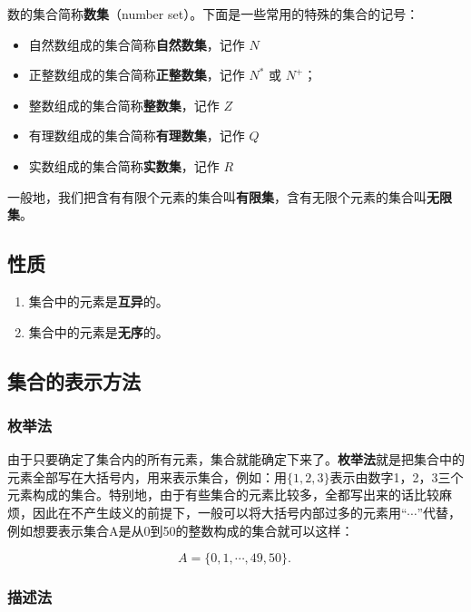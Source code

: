 数的集合简称\textbf{数集}（number set）。下面是一些常用的特殊的集合的记号：
\begin{itemize}
\item 自然数组成的集合简称\textbf{自然数集}，记作 $N$
\item 正整数组成的集合简称\textbf{正整数集}，记作 $N^{*}$ 或 $N^{+}$； 
\item 整数组成的集合简称\textbf{整数集}，记作 $Z$
\item 有理数组成的集合简称\textbf{有理数集}，记作 $Q$
\item 实数组成的集合简称\textbf{实数集}，记作 $R$
\end{itemize}

一般地，我们把含有有限个元素的集合叫\textbf{有限集}，含有无限个元素的集合叫\textbf{无限集}。



\subsection{性质}
\begin{enumerate}
\item 集合中的元素是\textbf{互异}的。
\item 集合中的元素是\textbf{无序}的。
\end{enumerate}



\subsection{集合的表示方法}

\subsubsection{枚举法}

由于只要确定了集合内的所有元素，集合就能确定下来了。\textbf{枚举法}就是把集合中的元素全部写在大括号内，用来表示集合，例如：用$\{1,2,3\}$表示由数字1，2，3三个元素构成的集合。特别地，由于有些集合的元素比较多，全都写出来的话比较麻烦，因此在不产生歧义的前提下，一般可以将大括号内部过多的元素用“$\cdots$”代替，例如想要表示集合A是从0到50的整数构成的集合就可以这样：

\begin{equation}
A=\{0,1, \cdots ,49,50\}.~
\end{equation}


\subsubsection{描述法}

